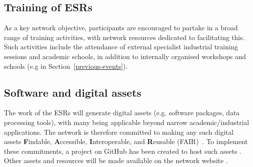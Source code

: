 \subsection{Training of ESRs}
\label{training}
As a key network objective, participants are encouraged to partake in a broad range of training activities, with network resources dedicated to facilitating this. Such activities include the attendance of external specialist industrial training sessions and academic schools, in addition to internally organised workshops and schools (e.g in Section~\ref{previous-events}).

\subsection{Software and digital assets}
\label{software}
The work of the ESRs will generate digital assets (e.g. software packages, data processing tools), with many being applicable beyond narrow academic/industrial applications. The network is therefore committed to making any such digital assets \textbf{F}indable, \textbf{A}ccessible, \textbf{I}nteroperable, and \textbf{R}eusable (FAIR)~\cite{FAIR-principles}. To implement these commitments, a project on GitHub has been created to host such assets \cite{SMARTHEP-github}. Other assets and resources will be made available on the network website \cite{SMARTHEP-website}.